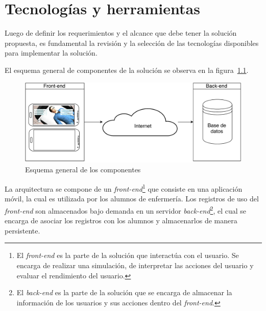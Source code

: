 \chapter{Tecnologías y herramientas}
\label{chap:tecnologias}

Luego de definir los requerimientos y el alcance que debe tener la solución propuesta, 
es fundamental la revisión y la selección de las tecnologías disponibles para
implementar la solución. 



El esquema general de componentes de la solución se observa en la figura~\ref{fig:componentes}.

\begin{figure}[H]
\begin{center}
    \includegraphics[scale=0.5]{tecnologias/images/full.pdf}
\end{center}
\caption{Esquema general de los componentes}
\label{fig:componentes}
\end{figure}

La arquitectura se compone de un \textit{front-end}\footnote{El \textit{front-end}
    es la parte de la solución que interactúa con el usuario. Se encarga de
    realizar una simulación, de interpretar las acciones del usuario y evaluar
    el rendimiento del usuario.} que consiste en una aplicación móvil, la cual
es utilizada por los alumnos de enfermería. Los registros de uso del \textit{front-end} son 
almacenados bajo demanda en un servidor
\textit{back-end}\footnote{El \textit{back-end} es la parte de la solución que
    se encarga de almacenar la información de los usuarios y sus acciones dentro
    del \textit{front-end}.}, el cual se encarga de asociar los registros con
los alumnos y almacenarlos de manera persistente.

